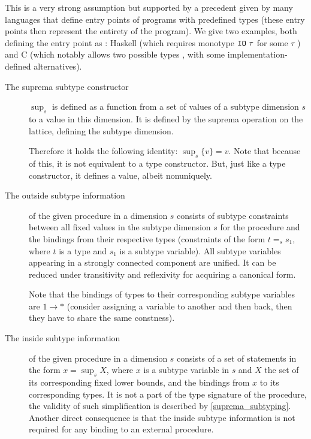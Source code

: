 This is a very strong assumption but supported by a precedent given by many languages that define entry points of programs with predefined types (these entry points then represent the entirety of the program). We give two examples, both defining the entry point as : Haskell (which requires monotype $\mathtt{IO}\ \tau$ for some $\tau$ \cite{haskell2010}) and C (which notably allows two possible types \cite{cstandard2018}, with some implementation-defined alternatives).


\begin{description}
    \item[The suprema subtype constructor] $\sup_s$ is defined as a function from a set of values of a subtype dimension $s$ to a value in this dimension. It is defined by the suprema operation on the lattice, defining the subtype dimension.

    Therefore it holds the following identity: $\sup_s \{v\} = v$. Note that because of this, it is not equivalent to a type constructor. But, just like a type constructor, it defines a value, albeit nonuniquely.

    \item[The outside subtype information] of the given procedure in a dimension $s$ consists of subtype constraints between all fixed values in the subtype dimension $s$ for the procedure and the bindings from their respective types (constraints of the form $t =_s s_1$, where $t$ is a type and $s_1$ is a subtype variable). All subtype variables appearing in a strongly connected component are unified. It can be reduced under transitivity and reflexivity for acquiring a canonical form.

    Note that the bindings of types to their corresponding subtype variables are $1 \to \ast$ (consider assigning a variable to another and then back, then they have to share the same constness).

    \item[The inside subtype information] of the given procedure in a dimension $s$ consists of a set of statements in the form $x = \sup_s X$, where $x$ is a subtype variable in $s$ and $X$ the set of its corresponding fixed lower bounds, and the bindings from $x$ to its corresponding types. It is not a part of the type signature of the procedure, the validity of such simplification is described by \cref{suprema_subtyping}. Another direct consequence is that the inside subtype information is not required for any binding to an external procedure.
\end{description}

